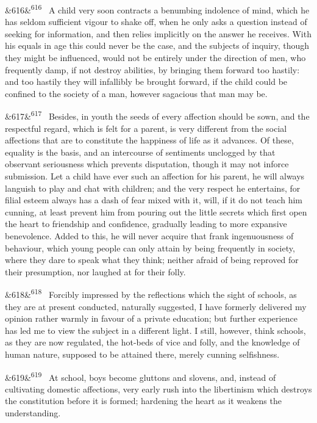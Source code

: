\documentclass[12pt]{article}
\newcommand{\para}[1][]{\par\noindent\ifx&#1&\else\textsuperscript{\footnotesize #1}~\fi}
\begin{document}
\para[616] A child very soon contracts a benumbing indolence of mind, which he has seldom sufficient vigour to shake off, when he only asks a question instead of seeking for information, and then relies implicitly on the answer he receives. With his equals in age this could never be the case, and the subjects of inquiry, though they might be influenced, would not be entirely under the direction of men, who frequently damp, if not destroy abilities, by bringing them forward too hastily: and too hastily they will infallibly be brought forward, if the child could be confined to the society of a man, however sagacious that man may be.

\para[617] Besides, in youth the seeds of every affection should be sown, and the respectful regard, which is felt for a parent, is very different from the social affections that are to constitute the happiness of life as it advances. Of these, equality is the basis, and an intercourse of sentiments unclogged by that observant seriousness which prevents disputation, though it may not inforce submission. Let a child have ever such an affection for his parent, he will always languish to play and chat with children; and the very respect he entertains, for filial esteem always has a dash of fear mixed with it, will, if it do not teach him cunning, at least prevent him from pouring out the little secrets which first open the heart to friendship and confidence, gradually leading to more expansive benevolence. Added to this, he will never acquire that frank ingenuousness of behaviour, which young people can only attain by being frequently in society, where they dare to speak what they think; neither afraid of being reproved for their presumption, nor laughed at for their folly.

\para[618] Forcibly impressed by the reflections which the sight of schools, as they are at present conducted, naturally suggested, I have formerly delivered my opinion rather warmly in favour of a private education; but further experience has led me to view the subject in a different light. I still, however, think schools, as they are now regulated, the hot-beds of vice and folly, and the knowledge of human nature, supposed to be attained there, merely cunning selfishness.

\para[619] At school, boys become gluttons and slovens, and, instead of cultivating domestic affections, very early rush into the libertinism which destroys the constitution before it is formed; hardening the heart as it weakens the understanding.
\end{document}
